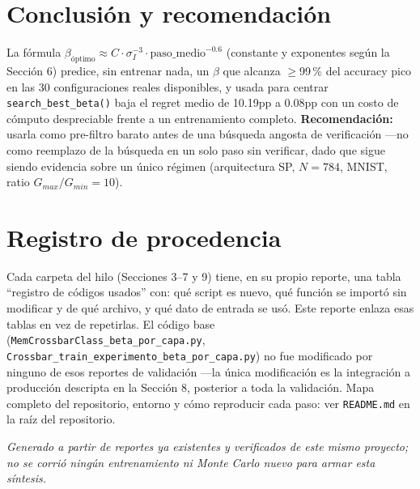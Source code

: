\documentclass[11pt]{article}
\begin{document}
\section{Conclusión y recomendación}

La fórmula $\beta_{\text{óptimo}}\approx C\cdot\sigma_I^{-3}\cdot\mathrm{paso\_medio}^{-0.6}$
(constante y exponentes según la Sección 6) predice, sin entrenar nada, un $\beta$ que
alcanza $\geq$99\,\% del accuracy pico en las 30 configuraciones reales disponibles, y usada
para centrar \texttt{search\_best\_beta()} baja el regret medio de 10.19pp a 0.08pp con un
costo de cómputo despreciable frente a un entrenamiento completo. \textbf{Recomendación:}
usarla como pre-filtro barato antes de una búsqueda angosta de verificación —no como reemplazo
de la búsqueda en un solo paso sin verificar, dado que sigue siendo evidencia sobre un único
régimen (arquitectura SP, $N=784$, MNIST, ratio $G_{max}/G_{min}=10$).

\section{Registro de procedencia}

Cada carpeta del hilo (Secciones 3–7 y 9) tiene, en su propio reporte, una tabla
``registro de códigos usados'' con: qué script es nuevo, qué función se importó sin modificar
y de qué archivo, y qué dato de entrada se usó. Este reporte enlaza esas tablas en vez de
repetirlas. El código base (\texttt{MemCrossbarClass\_beta\_por\_capa.py},
\texttt{Crossbar\_train\_experimento\_beta\_por\_capa.py}) no fue modificado por ninguno de
esos reportes de validación —la única modificación es la integración a producción descripta
en la Sección 8, posterior a toda la validación. Mapa completo del repositorio, entorno y
cómo reproducir cada paso: ver \texttt{README.md} en la raíz del repositorio.

\bigskip
\noindent\textit{Generado a partir de reportes ya existentes y verificados de este mismo
proyecto; no se corrió ningún entrenamiento ni Monte Carlo nuevo para armar esta síntesis.}
\end{document}
